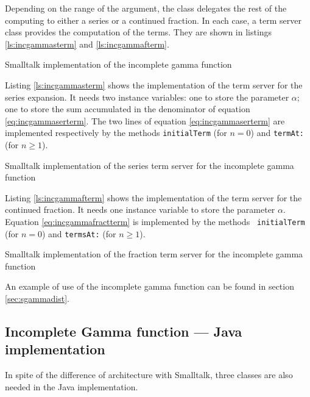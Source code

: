 \documentclass[twoside]{book}
\begin{document}
Depending on the range of the argument, the class delegates the
rest of the computing to either a series or a continued fraction.
In each case, a term server class provides the computation of the
terms. They are shown in listings \ref{ls:incgammasterm} and
\ref{ls:incgammafterm}.
\begin{listing} Smalltalk implementation of the incomplete gamma function \label{ls:incgamma}

\end{listing}
Listing \ref{ls:incgammasterm} shows the implementation of the
term server for the series expansion. It needs two instance
variables: one to store the parameter $\alpha$; one to store the
sum accumulated in the denominator of equation
\ref{eq:incgammaserterm}. The two lines of equation
\ref{eq:incgammaserterm} are implemented respectively by the
methods {\tt initialTerm}  (for $n=0$) and {\tt termAt:} (for
$n\ge 1$).
\begin{listing} Smalltalk implementation of the series term server for the incomplete gamma function \label{ls:incgammasterm}

\end{listing}
Listing \ref{ls:incgammafterm} shows the implementation of the
term server for the continued fraction. It needs one instance
variable to store the parameter $\alpha$. Equation
\ref{eq:incgammafractterm} is implemented by the methods {\tt
initialTerm}  (for $n=0$) and {\tt termsAt:} (for $n\ge 1$).
\begin{listing} Smalltalk implementation of the fraction term server for the incomplete gamma function \label{ls:incgammafterm}

\end{listing}
An example of use of the incomplete gamma function can be found in
section \ref{sec:sgammadist}.

\subsection{Incomplete Gamma function --- Java  implementation}
\label{sec:jincgamma} In spite of the
difference of architecture with Smalltalk, three classes are also
needed in the Java implementation.
\end{document}
